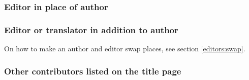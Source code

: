 \documentclass[11pt,letterpaper,oneside]{article}
\begin{document}
\begin{citebib}
\item \cite[79--80]{gawande2014}
\item \cite[191]{gawande2014}
\end{citebib}

\setcounter{subsubsection}{102}
\subsubsection{Editor in place of author}
\label{14.103}

\begin{citebib}
\item \cite[100]{egan2014}
\item \cite[33]{schechter2011}
\item \cite[34]{silverstein1974}
\item \cite[301--2]{egan2014}
\item \cite[54--56]{schechter2011}
\item \cite[38]{silverstein1974}
\end{citebib}

\subsubsection{Editor or translator in addition to author}
\label{14.104}

On how to make an author and editor swap places, see section
\ref{editors:swap}.

\begin{citebib}
\item \cite{bonnefoy1995}
\item \cite{menchu1999}
\item \cite{adorno1999}
\item \cite{pound1953}
\end{citebib}

\subsubsection{Other contributors listed on the title page}
\label{14.105}

\begin{citebib}
\item \cite{chaucer1966}
\item \cite{cullen1961}
\item \cite{hayek1994}
\item \cite{prather1998}
\item \cite{williams1990}
\end{citebib}
\end{document}
